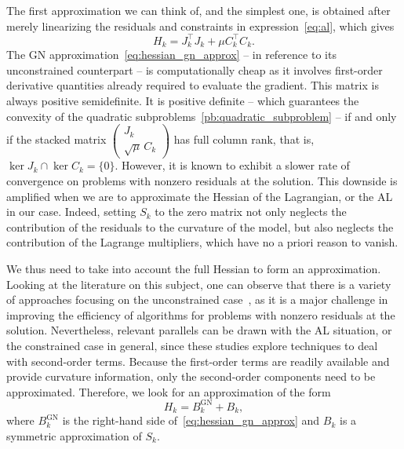 \documentclass[pdflatex,sn-mathphys-num]{sn-jnl}%
\theoremstyle{thmstyleone}%
\begin{document}
The first approximation we can think of, and the simplest one, is obtained after merely linearizing the residuals and constraints in expression~\eqref{eq:al}, which gives
\begin{equation}\label{eq:hessian_gn_approx}
	H_k = J_k^\top J_k + \mu C_k^\top C_k.
\end{equation}
The GN approximation~\eqref{eq:hessian_gn_approx} -- in reference to its unconstrained counterpart -- is computationally cheap as it involves first-order derivative quantities already required to evaluate the gradient. This matrix is always positive semidefinite. It is positive definite -- which guarantees the convexity of the quadratic subproblems~\eqref{pb:quadratic_subproblem} -- if and only if the stacked matrix $\left(\begin{smallmatrix} J_k \\ \sqrt{\mu}\,C_k \end{smallmatrix}\right)$ has full column rank, that is, $\ker J_k \cap \ker C_k = \{0\}$. However, it is known to exhibit a slower rate of convergence on problems with nonzero residuals at the solution. This downside is amplified when we are to approximate the Hessian of the Lagrangian, or the AL in our case. Indeed, setting $S_k$ to the zero matrix not only neglects the contribution of the residuals to the curvature of the model, but also neglects the contribution of the Lagrange multipliers, which have no a priori reason to vanish.

We thus need to take into account the full Hessian to form an approximation. Looking at the literature on this subject, one can observe that there is a variety of approaches focusing on the unconstrained case~\cite{biggs:1977,dennisetal:1981,huschens1994,yabetakahashi:1991,zhang-etal:2000,lucksan-etal:2019}, as it is a major challenge in improving the efficiency of algorithms for problems with nonzero residuals at the solution. Nevertheless, relevant parallels can be drawn with the AL situation, or the constrained case in general, since these studies explore techniques to deal with second-order terms. Because the first-order terms are readily available and provide curvature information, only the second-order components need to be approximated. Therefore, we look for an approximation of the form 
\begin{equation}\label{eq:hessian_full_approx}
	H_k = B^{\mathrm{GN}}_k + B_k,
\end{equation}
where $B^{\mathrm{GN}}_k$ is the right-hand side of~\eqref{eq:hessian_gn_approx} and $B_k$ is a symmetric approximation of $S_k$. 
\end{document}
